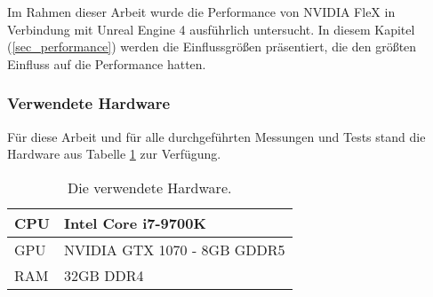 
Im Rahmen dieser Arbeit wurde die Performance von NVIDIA FleX in Verbindung mit Unreal Engine 4 ausführlich untersucht. In diesem Kapitel (\ref{sec_performance}) werden die Einflussgrößen präsentiert, die den größten Einfluss auf die Performance hatten.

\subsubsection{Verwendete Hardware}

Für diese Arbeit und für alle durchgeführten Messungen und Tests stand die Hardware aus Tabelle \ref{table_hardware} zur Verfügung.


\begin{table}[hbt!]
\centering
\caption{Die verwendete Hardware.}
\label{table_hardware}
\begin{tabular}{l|l}
 \hline
CPU & Intel Core i7-9700K  \\ \hline
GPU & NVIDIA GTX 1070 - 8GB GDDR5      \\ \hline
RAM & 32GB DDR4            \\ \hline
\end{tabular}
\end{table}



